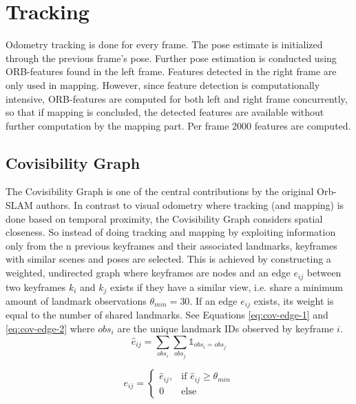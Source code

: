 \documentclass[a4paper, 10pt]{article}
\begin{document}
\section{Tracking}
\label{sec:org5b967d4}
Odometry tracking is done for every frame. The pose estimate is initialized through the previous frame’s pose. Further pose estimation is conducted using ORB-features found in the left frame.
Features detected in the right frame are only used in mapping. However, since feature detection is computationally intensive, ORB-features are computed for both left and right frame concurrently, 
so that if mapping is concluded, the detected features are available without further computation by the mapping part. Per frame 2000 features are computed. 

\subsection{Covisibility Graph}
\label{sec:orga67568c}

The Covisibility Graph is one of the central contributions by the original Orb-SLAM authors. In contrast to visual odometry where tracking (and mapping) is done based on temporal proximity, the Covisibility Graph 
considers spatial closeness.
So instead of doing tracking and mapping by exploiting information only from the n previous keyframes and their associated landmarks, keyframes with similar scenes and poses are selected.
This is achieved by constructing a weighted, undirected graph where keyframes are nodes and an edge \(e_{ij}\) between two keyframes \(k_i\) and \(k_j\) exists if they have a similar view, 
i.e. share a minimum amount of landmark observations \(\theta_{min}=30\).
If an edge \(e_{ij}\) exists, its weight is equal to the number of shared landmarks. See Equations \ref{eq:cov-edge-1} and \ref{eq:cov-edge-2} where \(obs_i\) are the unique landmark IDs observed by keyframe \(i\).
\begin{equation}
\label{eq:cov-edge-1}
\widehat{e}_{ij} = \sum_{obs_i}\sum_{obs_j}\mathbb{1}_{obs_i=obs_j}
\end{equation}

\begin{equation}
\label{eq:cov-edge-2}
e_{ij} = 
\begin{cases}
\widehat{e}_{ij}, & \text{if } \widehat{e}_{ij} \geq \theta_{min} \\
0 & \text{else}
\end{cases}
\end{equation}
\end{document}
